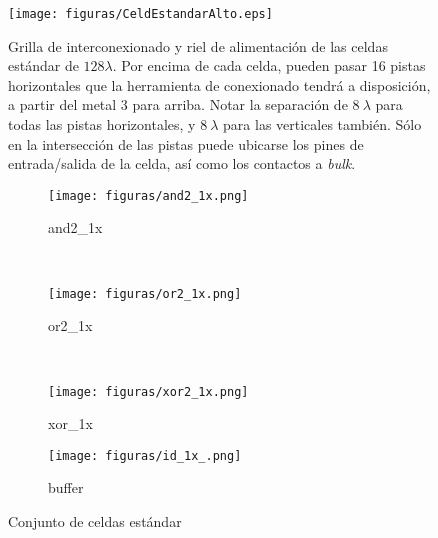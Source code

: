  \begin{figure}[h]
\centering
\texttt{[image: figuras/CeldEstandarAlto.eps]}
  \caption{Grilla de interconexionado y riel de alimentación de las celdas estándar de $128 \lambda$. Por encima de cada celda, pueden pasar 16 pistas horizontales que la herramienta de conexionado tendrá a disposición, a partir del metal 3 para arriba. Notar la separación de $8~ \lambda$ para todas las pistas horizontales, y $8~\lambda$ para las verticales también. Sólo en la intersección de las pistas puede ubicarse los pines de entrada/salida de la celda, así como los contactos a \emph{bulk}.}
  \label{fig:pitchCeldaEstandar}
\end{figure}

\begin{figure}
        \centering
        \begin{subfigure}[b]{0.15\textwidth}
                \texttt{[image: figuras/and2\_1x.png]}
                \caption{and2\_1x}
                \label{fig:gull}
        \end{subfigure}\quad
        ~ %
        \begin{subfigure}[b]{0.15\textwidth}
                \texttt{[image: figuras/or2\_1x.png]}
                \caption{or2\_1x}
                \label{fig:tiger}
        \end{subfigure} 
        ~ %
        \begin{subfigure}[b]{0.15\textwidth}
                \texttt{[image: figuras/xor2\_1x.png]}
                \caption{xor\_1x}
                \label{fig:mouse}
        \end{subfigure}\qquad
        \begin{subfigure}[b]{0.15\textwidth}
                \texttt{[image: figuras/id\_1x\_.png]}
                \caption{buffer}
                \label{fig:mouse}
        \end{subfigure}
        \caption{Conjunto de celdas estándar}\label{fig:animals}
\end{figure}







